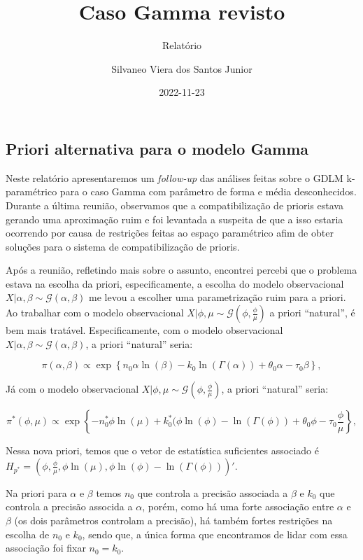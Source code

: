 \documentclass[
]{article}
\title{Caso Gamma revisto}
\subtitle{Relatório}
\author{Silvaneo Viera dos Santos Junior}
\date{2022-11-23}
\begin{document}
\maketitle

\hypertarget{priori-alternativa-para-o-modelo-gamma}{%
\subsection{Priori alternativa para o modelo
Gamma}\label{priori-alternativa-para-o-modelo-gamma}}

Neste relatório apresentaremos um \emph{follow-up} das análises feitas
sobre o GDLM k-paramétrico para o caso Gamma com parâmetro de forma e
média desconhecidos. Durante a última reunião, observamos que a
compatibilização de prioris estava gerando uma aproximação ruim e foi
levantada a suspeita de que a isso estaria ocorrendo por causa de
restrições feitas ao espaço paramétrico afim de obter soluções para o
sistema de compatibilização de prioris.

Após a reunião, refletindo mais sobre o assunto, encontrei percebi que o
problema estava na escolha da priori, especificamente, a escolha do
modelo observacional
\(X|\alpha,\beta \sim \mathcal{G}\left(\alpha,\beta\right)\) me levou a
escolher uma parametrização ruim para a priori. Ao trabalhar com o
modelo observacional
\(X|\phi,\mu \sim \mathcal{G}\left(\phi,\frac{\phi}{\mu}\right)\) a
priori ``natural'', é bem mais tratável. Especificamente, com o modelo
observacional
\(X|\alpha,\beta \sim \mathcal{G}\left(\alpha,\beta\right)\), a priori
``natural'' seria:

\[
\pi(\alpha,\beta) \propto \exp\left\{n_0\alpha \ln(\beta)-k_0\ln(\Gamma(\alpha))+\theta_0\alpha-\tau_0\beta\right\},
\]

Já com o modelo observacional
\(X|\phi,\mu \sim \mathcal{G}\left(\phi,\frac{\phi}{\mu}\right)\), a
priori ``natural'' seria:

\[
\pi^*(\phi,\mu) \propto \exp\left\{-n^*_0\phi \ln(\mu)+k^*_0(\phi\ln(\phi)-\ln(\Gamma(\phi))+\theta_0\phi-\tau_0\frac{\phi}{\mu}\right\},
\]

Nessa nova priori, temos que o vetor de estatística suficientes
associado é
\(H_{p^*}=\left(\phi,\frac{\phi}{\mu},\phi\ln(\mu),\phi\ln(\phi)-\ln(\Gamma(\phi))\right)'\).

Na priori para \(\alpha\) e \(\beta\) temos \(n_0\) que controla a
precisão associada a \(\beta\) e \(k_0\) que controla a precisão
associda a \(\alpha\), porém, como há uma forte associação entre
\(\alpha\) e \(\beta\) (os dois parâmetros controlam a precisão), há
também fortes restrições na escolha de \(n_0\) e \(k_0\), sendo que, a
única forma que encontramos de lidar com essa associação foi fixar
\(n_0=k_0\).
\end{document}
